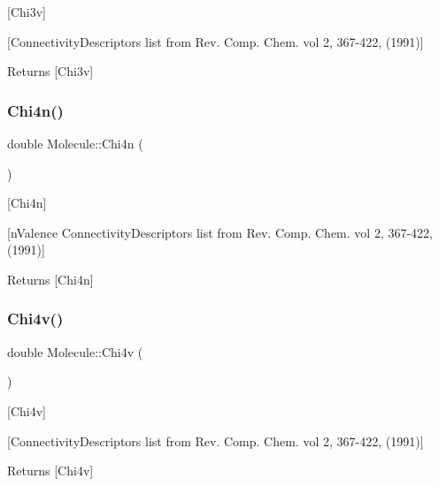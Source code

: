 \mbox{[}Chi3v\mbox{]} 

\mbox{[}Connectivity\+Descriptors list from Rev. Comp. Chem. vol 2, 367-\/422, (1991)\mbox{]}

\begin{DoxyReturn}{Returns}
\mbox{[}Chi3v\mbox{]} 
\end{DoxyReturn}
\mbox{\label{class_molecule_a5724983b9e05e85161df48e5c8486d77}} 
\subsubsection{\texorpdfstring{Chi4n()}{Chi4n()}}
{\footnotesize\ttfamily double Molecule\+::\+Chi4n (\begin{DoxyParamCaption}{ }\end{DoxyParamCaption})}



\mbox{[}Chi4n\mbox{]} 

\mbox{[}n\+Valence Connectivity\+Descriptors list from Rev. Comp. Chem. vol 2, 367-\/422, (1991)\mbox{]}

\begin{DoxyReturn}{Returns}
\mbox{[}Chi4n\mbox{]} 
\end{DoxyReturn}
\mbox{\label{class_molecule_a26ca2dbe4464eee3cf0405c1a09fb310}} 
\subsubsection{\texorpdfstring{Chi4v()}{Chi4v()}}
{\footnotesize\ttfamily double Molecule\+::\+Chi4v (\begin{DoxyParamCaption}{ }\end{DoxyParamCaption})}



\mbox{[}Chi4v\mbox{]} 

\mbox{[}Connectivity\+Descriptors list from Rev. Comp. Chem. vol 2, 367-\/422, (1991)\mbox{]}

\begin{DoxyReturn}{Returns}
\mbox{[}Chi4v\mbox{]} 
\end{DoxyReturn}
\mbox{\label{class_molecule_a383c34ed1e85d4f07e1f70ee20eeb5ae}} 
